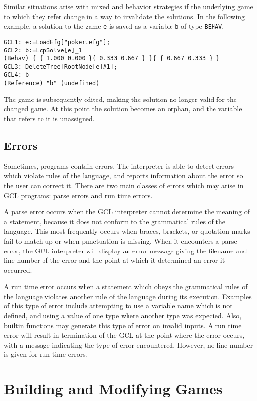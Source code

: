 Similar situations arise with mixed and behavior strategies if the
underlying game to which they refer change in a way to invalidate the
solutions.  In the following example, a solution to the game \verb+e+
is saved as a variable \verb+b+ of type \verb+BEHAV+.  

\begin{verbatim}
GCL1: e:=LoadEfg["poker.efg"];
GCL2: b:=LcpSolve[e]_1
(Behav) { { 1.000 0.000 }{ 0.333 0.667 } }{ { 0.667 0.333 } }
GCL3: DeleteTree[RootNode[e]#1];
GCL4: b
(Reference) "b" (undefined)
\end{verbatim}

The game is subsequently edited, making the solution no longer valid
for the changed game.  At this point the solution becomes an orphan,
and the variable that refers to it is unassigned.  

\section{Errors}

Sometimes, programs contain errors.  The interpreter is able to detect
errors which violate rules of the language, and reports information
about the error so the user can correct it.  There are two main
classes of errors which may arise in GCL programs: parse errors and
run time errors.

A parse error occurs when the GCL interpreter cannot determine the
meaning of a statement, because it does not conform to the grammatical
rules of the language.  This most frequently occurs when braces,
brackets, or quotation marks fail to match up or when punctuation is
missing.  When it encounters a parse error, the GCL interpreter will
display an error message giving the filename and line number of the
error and the point at which it determined an error it occurred.

A run time error occurs when a statement which obeys the grammatical
rules of the language violates another rule of the language during its
execution.  Examples of this type of error include attempting to use a
variable name which is not defined, and using a value of one type
where another type was expected.  Also, builtin functions may generate
this type of error on invalid inputs.  A run time error will result in
termination of the GCL at the point where the error occurs, with a
message indicating the type of error encountered.  However, no line
number is given for run time errors.  

\chapter{Building and Modifying Games}

